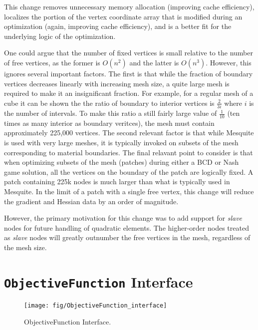 \documentclass{article}
\begin{document}
This change removes unnecessary memory allocation (improving cache efficiency), localizes the portion of the vertex coordinate array that is modified during an optimization (again, improving cache efficiency), and is a better fit for the underlying logic of the optimization.

One could argue that the number of fixed vertices is small relative to the number of free vertices, as the former is $O(n^2)$ and the latter is $O(n^3)$.  However, this ignores several important factors.  The first is that while the fraction of boundary vertices decreases linearly with increasing mesh size, a quite large mesh is required to make it an insignificant fraction.  For example, for a regular mesh of a cube it can be shown the the ratio of boundary to interior vertices is $\frac{2}{3i}$ where $i$ is the number of intervals.  To make this ratio a still fairly large value of $\frac{1}{10}$ (ten times as many interior as boundary veritces), the mesh must contain approximately 225,000 vertices.  The second relevant factor is that while Mesquite is used with very large meshes, it is typically invoked on subsets of the mesh corresponding to material boundaries.  The final relavant point to consider is that when optimizing subsets of the mesh (patches) during either a BCD or Nash game solution, all the vertices on the boundary of the patch are logically fixed.  A patch containing 225k nodes is much larger than what is typically used in Mesquite.  In the limit of a patch with a single free vertex, this change will reduce the gradient and Hessian data by an order of magnitude.

However, the primary motivation for this change was to add support for \emph{slave} nodes for future handling of quadratic elements.  The higher-order nodes treated as \emph{slave} nodes will greatly outnumber the free vertices in the mesh, regardless of the mesh size.

\section{\texttt{ObjectiveFunction} Interface}
\label{sec:ofiface}

\begin{figure}[htb]
\begin{center}
\texttt{[image: fig/ObjectiveFunction\_interface]}
\caption{ObjectiveFunction Interface.\label{fig:ofiface}}
\end{center}
\end{figure}
\end{document}
